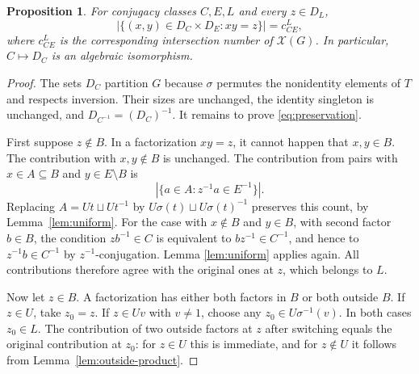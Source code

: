 \documentclass[11pt]{amsart}
\numberwithin{equation}{section}
\newtheorem{proposition}[theorem]{Proposition}
\theoremstyle{definition}
\theoremstyle{remark}
\newcommand{\X}{\mathcal X}
\begin{document}
\begin{proposition}\label{prop:algebraic}
For conjugacy classes $C,E,L$ and every $z\in D_L$,
\begin{equation}\label{eq:preservation}
 |\{(x,y)\in D_C\times D_E:xy=z\}|=c_{CE}^{L},
\end{equation}
where $c_{CE}^{L}$ is the corresponding intersection number of $\X(G)$. In particular, $C\mapsto D_C$ is an algebraic isomorphism.
\end{proposition}
\begin{proof}
The sets $D_C$ partition $G$ because $\sigma$ permutes the nonidentity
elements of $T$ and respects inversion. Their sizes are unchanged, the
identity singleton is unchanged, and
$D_{C^{-1}}=(D_C)^{-1}$. It remains to prove
\eqref{eq:preservation}.

First suppose $z\notin B$. In a factorization $xy=z$, it cannot happen that $x,y\in B$. 
The contribution with $x,y \not\in B$ is unchanged. 
The contribution from pairs with \(x\in A\subseteq B\) and \(y\in E\setminus B\) is
\[
 |\{a\in A:z^{-1}a\in E^{-1}\}|.
\]
Replacing $A=Ut\sqcup U{t^{-1}}$ by $U{\sigma(t)}\sqcup U{\sigma(t)^{-1}}$ preserves this count, by Lemma~\ref{lem:uniform}. 
For the case with \(x\not\in B\) and \(y\in B\), with second
factor $b\in B$, the condition $zb^{-1}\in C$ is equivalent to
$bz^{-1}\in C^{-1}$, and hence to $z^{-1}b\in C^{-1}$ by $z^{-1}$-conjugation.
Lemma \ref{lem:uniform} applies again. All contributions therefore agree with the
original ones at $z$, which belongs to $L$.

Now let $z\in B$. A factorization has either both factors in $B$ or
both outside $B$. If $z\in U$, take $z_0=z$. If $z\in Uv$ with
$v\ne1$, choose any $z_0\in U{\sigma^{-1}(v)}$. In both cases
$z_0\in L$. The contribution of two outside factors at $z$ after
switching equals the original contribution at $z_0$: for $z\in U$
this is immediate, and for $z\notin U$ it follows from
Lemma~\ref{lem:outside-product}.


\end{proof}
\end{document}
